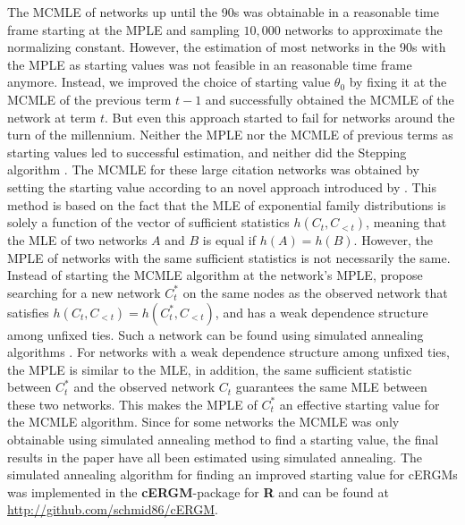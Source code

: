 \documentclass[headsepline=true, abstracton]{scrartcl}
\begin{document}

The MCMLE of networks up until the 90s was obtainable in a reasonable time frame starting at the MPLE and sampling $10,000$ networks to approximate the normalizing constant. However, the estimation of most networks in the 90s with the MPLE as starting values was not feasible in an reasonable time frame anymore. Instead, we improved the choice of starting value $\theta_0$ by fixing it at the MCMLE of the previous term $t-1$ and successfully obtained the MCMLE of the network at term $t$. But even this approach started to fail for networks around the turn of the millennium. Neither the MPLE nor the MCMLE of previous terms as starting values led to successful estimation, and neither did the Stepping algorithm \citep{hummel2012improving}. 
The MCMLE for these large citation networks was obtained by setting the starting value according to an novel approach introduced by \citet{SchmidHunter2020}. This method is based on the fact that the MLE of exponential family distributions is solely a function of the vector of sufficient statistics $h(C_t, C_{<t})$, meaning that the MLE of two networks $A$ and $B$ is equal if $h(A)=h(B)$. However, the MPLE of networks with the same sufficient statistics is not necessarily the same. Instead of starting the MCMLE algorithm at the network's MPLE, \citet{SchmidHunter2020} propose searching for a new network $C_t^*$ on the same nodes as the observed network that satisfies $h(C_t, C_{<t}) = h(C_t^*, C_{<t})$, and has a weak dependence structure among unfixed ties. Such a network can be found using simulated annealing algorithms \citep{Kirkpatrick83}. For networks with a weak dependence structure among unfixed ties, the MPLE is similar to the MLE, in addition, the same sufficient statistic between $C_t^*$ and the observed network $C_t$ guarantees the same MLE between these two networks. This makes the MPLE of $C_t^*$ an effective starting value for the MCMLE algorithm. Since for some networks the MCMLE was only obtainable using simulated annealing method to find a starting value, the final results in the paper have all been estimated using simulated annealing.
The simulated annealing algorithm for finding an improved starting value for cERGMs was implemented in the \textbf{cERGM}-package for \textbf{R} \citep{RCore} and can be found at \url{http://github.com/schmid86/cERGM}.
\end{document}
